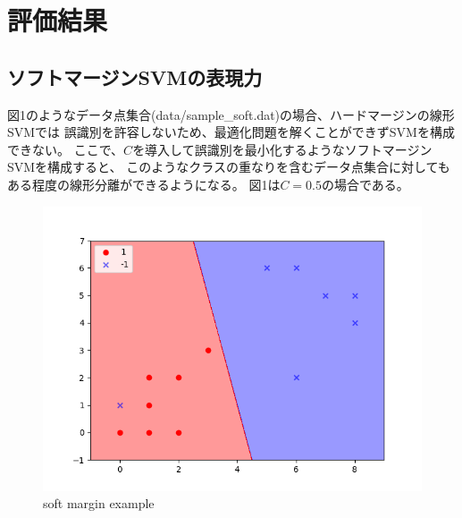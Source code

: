 \documentclass{jsarticle}
\begin{document}
\section{評価結果}
\subsection{ソフトマージンSVMの表現力}
図1のようなデータ点集合(data/sample\_soft.dat)の場合、ハードマージンの線形SVMでは
誤識別を許容しないため、最適化問題を解くことができずSVMを構成できない。
ここで、$C$を導入して誤識別を最小化するようなソフトマージンSVMを構成すると、
このようなクラスの重なりを含むデータ点集合に対してもある程度の線形分離ができるようになる。
図1は$C = 0.5$の場合である。
\begin{figure}[!h]
\centering \includegraphics[width=15cm]{soft_margin.png}
\caption{soft margin example}
\end{figure}
\end{document}
